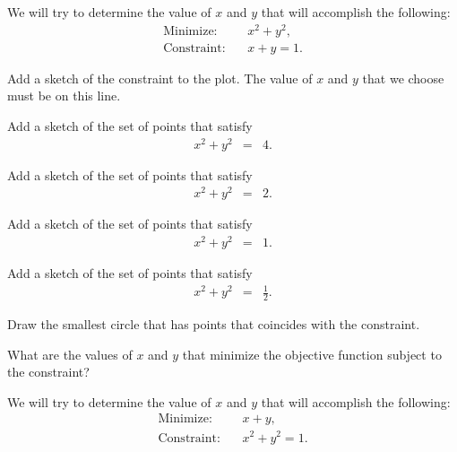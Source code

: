 \begin{problem}
\item We will try to determine the value of $x$ and $y$ that will
  accomplish the following:
  \begin{eqnarray*}
    \mathrm{Minimize:} & & x^2 + y^2, \\
    \mathrm{Constraint:} & & x + y = 1.
  \end{eqnarray*}

  \vspace{-1em}
  \scalebox{0.6}{}

  \begin{subproblem}
    \item Add a sketch of the constraint to the plot. The value of $x$
      and $y$ that we choose must be on this line.
    \item Add a sketch of the set of points that satisfy
      \begin{eqnarray*}
        x^2 + y^2 & = & 4.
      \end{eqnarray*}
    \item Add a sketch of the set of points that satisfy
      \begin{eqnarray*}
        x^2 + y^2 & = & 2.
      \end{eqnarray*}
    \item Add a sketch of the set of points that satisfy
      \begin{eqnarray*}
        x^2 + y^2 & = & 1.
      \end{eqnarray*}
    \item Add a sketch of the set of points that satisfy
      \begin{eqnarray*}
        x^2 + y^2 & = & \frac{1}{2}.
      \end{eqnarray*}
    \item Draw the smallest circle that has points that coincides with
      the constraint.
    \item What are the values of $x$ and $y$ that minimize the
      objective function subject to the constraint?
  \end{subproblem}

  \clearpage

\item We will try to determine the value of $x$ and $y$ that will
  accomplish the following:
  \begin{eqnarray*}
    \mathrm{Minimize:} & & x + y, \\
    \mathrm{Constraint:} & & x^2 + y^2 = 1.
  \end{eqnarray*}


\end{problem}
